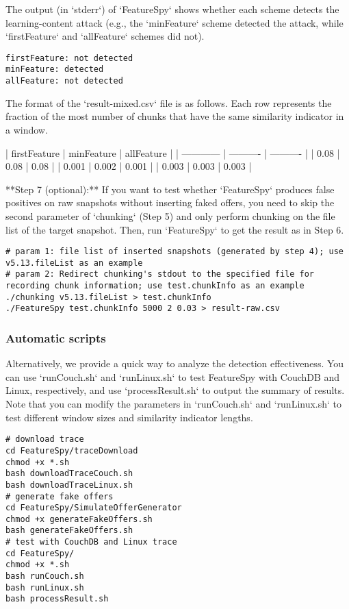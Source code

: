 The output (in `stderr`) of `FeatureSpy` shows whether each scheme detects the learning-content attack (e.g., the `minFeature` scheme detected the attack, while `firstFeature` and `allFeature` schemes did not).

\begin{lstlisting}[style=shell]
firstFeature: not detected
minFeature: detected
allFeature: not detected
\end{lstlisting}

The format of the `result-mixed.csv` file is as follows. Each row represents the fraction of the most number of chunks that have the same similarity indicator in a window.

| firstFeature | minFeature | allFeature |
| ------------ | ---------- | ---------- |
| 0.08         | 0.08       | 0.08       |
| 0.001        | 0.002      | 0.001      |
| 0.003        | 0.003      | 0.003      |

**Step 7 (optional):** If you want to test whether `FeatureSpy`  produces false positives on raw snapshots without inserting faked offers, you need to skip the second parameter of `chunking` (Step 5) and only perform chunking on the file list of the target snapshot. Then, run  `FeatureSpy` to get the result as in Step 6.


\begin{lstlisting}[style=shell]
# param 1: file list of inserted snapshots (generated by step 4); use v5.13.fileList as an example
# param 2: Redirect chunking's stdout to the specified file for recording chunk information; use test.chunkInfo as an example
./chunking v5.13.fileList > test.chunkInfo
./FeatureSpy test.chunkInfo 5000 2 0.03 > result-raw.csv
\end{lstlisting}

\subsubsection{Automatic scripts}

Alternatively, we provide a quick way to analyze the detection effectiveness. You can use `runCouch.sh` and `runLinux.sh` to test FeatureSpy with CouchDB and Linux, respectively, and use `processResult.sh` to output the summary of results. Note that you can modify the parameters in `runCouch.sh` and `runLinux.sh` to test different window sizes and similarity indicator lengths.

\begin{lstlisting}[style=shell]
# download trace
cd FeatureSpy/traceDownload
chmod +x *.sh
bash downloadTraceCouch.sh
bash downloadTraceLinux.sh
# generate fake offers
cd FeatureSpy/SimulateOfferGenerator
chmod +x generateFakeOffers.sh
bash generateFakeOffers.sh
# test with CouchDB and Linux trace
cd FeatureSpy/
chmod +x *.sh
bash runCouch.sh
bash runLinux.sh
bash processResult.sh
\end{lstlisting}

